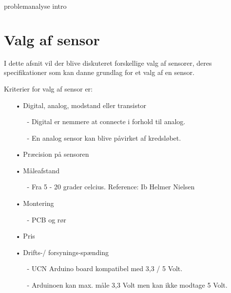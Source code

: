 problemanalyse intro

\section{Valg af sensor}
I dette afsnit vil der blive diskuteret forskellige valg af sensorer, deres specifikationer som kan danne grundlag for et valg af en sensor.

Kriterier for valg af sensor er:
\begin{enumerate}
	\item[•]Digital, analog, modstand eller transistor
	    \begin{enumerate}
	        \item[-]Digital er nemmere at connecte i forhold til analog.
	        \item[-]En analog sensor kan blive påvirket af kredsløbet.
	    \end{enumerate}	
	
	\item[•]Præcision på sensoren 
	\item[•]Måleafstand
		\begin{enumerate}
			\item[-]Fra 5 - 20 grader celcius. Reference: Ib Helmer Nielsen
		\end{enumerate}	
	\item[•]Montering
	    \begin{enumerate}
	        \item[-]PCB og rør
	    \end{enumerate}
	\item[•]Pris
	\item[•]Drifts-/ forsynings-spænding 
	    \begin{enumerate}
	        \item[-]UCN Arduino board kompatibel med 3,3 / 5 Volt.
	        \item[-]Arduinoen kan max. måle 3,3 Volt men kan ikke modtage 5 Volt.
	    \end{enumerate}
	
\end{enumerate}


